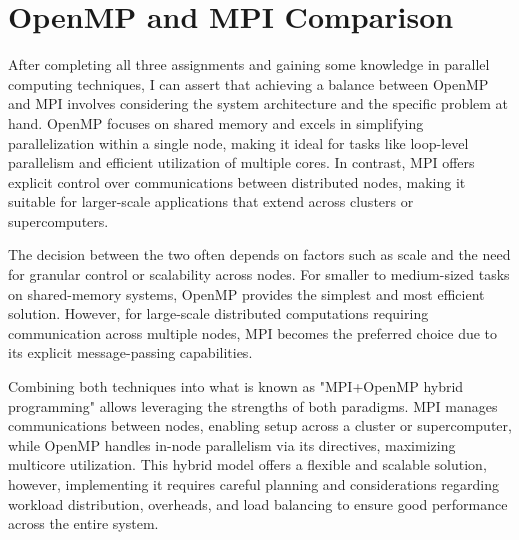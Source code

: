 \section{\label{sec:comparison}OpenMP and MPI Comparison}
After completing all three assignments and gaining some knowledge in parallel %
computing techniques, I can assert that achieving a balance between OpenMP and %
MPI involves considering the system architecture and the specific problem at hand. %
OpenMP focuses on shared memory and excels in simplifying parallelization within %
a single node, making it ideal for tasks like loop-level parallelism and efficient %
utilization of multiple cores. In contrast, MPI offers explicit control over %
communications between distributed nodes, making it suitable for larger-scale %
applications that extend across clusters or supercomputers. 

The decision between the two often depends on factors such as scale and the need %
for granular control or scalability across nodes. For smaller to medium-sized %
tasks on shared-memory systems, OpenMP provides the simplest and most efficient %
solution. However, for large-scale distributed computations requiring communication %
across multiple nodes, MPI becomes the preferred choice due to its explicit %
message-passing capabilities. 

Combining both techniques into what is known as "MPI+OpenMP hybrid programming" %
allows leveraging the strengths of both paradigms. MPI manages communications %
between nodes, enabling setup across a cluster or supercomputer, while OpenMP %
handles in-node parallelism via its directives, maximizing multicore utilization. %
This hybrid model offers a flexible and scalable solution, however, implementing %
it requires careful planning and considerations regarding workload distribution, %
overheads, and load balancing to ensure good performance across the entire system.

